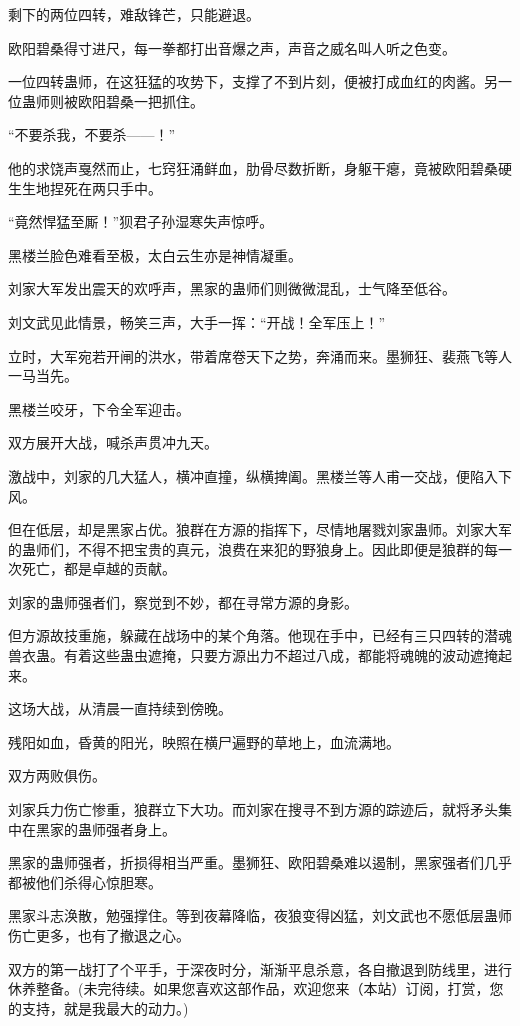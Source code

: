 \begin{this_body}
剩下的两位四转，难敌锋芒，只能避退。

欧阳碧桑得寸进尺，每一拳都打出音爆之声，声音之威名叫人听之色变。

一位四转蛊师，在这狂猛的攻势下，支撑了不到片刻，便被打成血红的肉酱。另一位蛊师则被欧阳碧桑一把抓住。

“不要杀我，不要杀——！”

他的求饶声戛然而止，七窍狂涌鲜血，肋骨尽数折断，身躯干瘪，竟被欧阳碧桑硬生生地捏死在两只手中。

“竟然悍猛至厮！”狈君子孙湿寒失声惊呼。

黑楼兰脸色难看至极，太白云生亦是神情凝重。

刘家大军发出震天的欢呼声，黑家的蛊师们则微微混乱，士气降至低谷。

刘文武见此情景，畅笑三声，大手一挥：“开战！全军压上！”

立时，大军宛若开闸的洪水，带着席卷天下之势，奔涌而来。墨狮狂、裴燕飞等人一马当先。

黑楼兰咬牙，下令全军迎击。

双方展开大战，喊杀声贯冲九天。

激战中，刘家的几大猛人，横冲直撞，纵横捭阖。黑楼兰等人甫一交战，便陷入下风。

但在低层，却是黑家占优。狼群在方源的指挥下，尽情地屠戮刘家蛊师。刘家大军的蛊师们，不得不把宝贵的真元，浪费在来犯的野狼身上。因此即便是狼群的每一次死亡，都是卓越的贡献。

刘家的蛊师强者们，察觉到不妙，都在寻常方源的身影。

但方源故技重施，躲藏在战场中的某个角落。他现在手中，已经有三只四转的潜魂兽衣蛊。有着这些蛊虫遮掩，只要方源出力不超过八成，都能将魂魄的波动遮掩起来。

这场大战，从清晨一直持续到傍晚。

残阳如血，昏黄的阳光，映照在横尸遍野的草地上，血流满地。

双方两败俱伤。

刘家兵力伤亡惨重，狼群立下大功。而刘家在搜寻不到方源的踪迹后，就将矛头集中在黑家的蛊师强者身上。

黑家的蛊师强者，折损得相当严重。墨狮狂、欧阳碧桑难以遏制，黑家强者们几乎都被他们杀得心惊胆寒。

黑家斗志涣散，勉强撑住。等到夜幕降临，夜狼变得凶猛，刘文武也不愿低层蛊师伤亡更多，也有了撤退之心。

双方的第一战打了个平手，于深夜时分，渐渐平息杀意，各自撤退到防线里，进行休养整备。(未完待续。如果您喜欢这部作品，欢迎您来（本站）订阅，打赏，您的支持，就是我最大的动力。)

\end{this_body}

